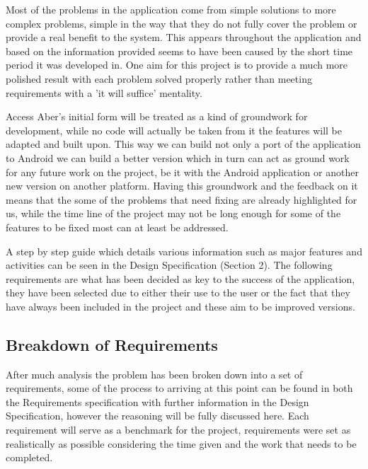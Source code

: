 Most of the problems in the application come from simple solutions to more complex problems, simple in the way that they do not fully cover the problem or provide a real benefit to the system. This appears throughout the application and based on the information provided seems to have been caused by the short time period it was developed in. One aim for this project is to provide a much more polished result with each problem solved properly rather than meeting requirements with a 'it will suffice' mentality. 

Access Aber's initial form will be treated as a kind of groundwork for development, while no code will actually be taken from it the features will be adapted and built upon. This way we can build not only a port of the application to Android we can build a better version which in turn can act as ground work for any future work on the project, be it with the Android application or another new version on another platform. Having this groundwork and the feedback on it means that the some of the problems that need fixing are already highlighted for us, while the time line of the project may not be long enough for some of the features to be fixed most can at least be addressed. 

A step by step guide which details various information such as major features and activities can be seen in the Design Specification (Section 2). The following requirements are what has been decided as key to the success of the application, they have been selected due to either their use to the user or the fact that they have always been included in the project and these aim to be improved versions. 
\subsection{Breakdown of Requirements}
After much analysis the problem has been broken down into a set of requirements, some of the process to arriving at this point can be found in both the Requirements specification with further information in the Design Specification, however the reasoning will be fully discussed here. Each requirement will serve as a benchmark for the project, requirements were set as realistically as possible considering the time given and the work that needs to be completed. 
